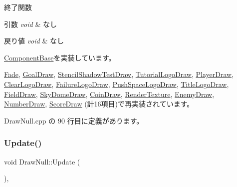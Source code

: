終了関数 


\begin{DoxyParams}{引数}
{\em void} & なし \\
\hline
\end{DoxyParams}

\begin{DoxyRetVals}{戻り値}
{\em void} & なし \\
\hline
\end{DoxyRetVals}


\mbox{\hyperlink{class_component_base_a9f42beaf0383d6f629819579cab4de57}{Component\+Base}}を実装しています。



\mbox{\hyperlink{class_fade_ae77d06811869d3c8162a42c3e0e14f7f}{Fade}}, \mbox{\hyperlink{class_goal_draw_a01318a0606848a3ca8ca7b7acbf4df24}{Goal\+Draw}}, \mbox{\hyperlink{class_stencil_shadow_test_draw_ad0672bf4ecfc8091cf54ed6f2c76b618}{Stencil\+Shadow\+Test\+Draw}}, \mbox{\hyperlink{class_tutorial_logo_draw_a949fb70954e3df28f87b8ed5c61bf8f1}{Tutorial\+Logo\+Draw}}, \mbox{\hyperlink{class_player_draw_a917b2947914287f23d87ca75cd68f553}{Player\+Draw}}, \mbox{\hyperlink{class_clear_logo_draw_aa73db5b701e644f8e552ddb254a0a9aa}{Clear\+Logo\+Draw}}, \mbox{\hyperlink{class_failure_logo_draw_a97646253380b54f37565650e211f33cd}{Failure\+Logo\+Draw}}, \mbox{\hyperlink{class_push_space_logo_draw_a79021c1df43968d6008de74126d53fba}{Push\+Space\+Logo\+Draw}}, \mbox{\hyperlink{class_title_logo_draw_a07bbf9e8de5c7b9ee028408496c13c50}{Title\+Logo\+Draw}}, \mbox{\hyperlink{class_field_draw_a89a78212c141714d9e39e25e663aaeff}{Field\+Draw}}, \mbox{\hyperlink{class_sky_dome_draw_aee1c6b102a97033073b2559b8c2c328b}{Sky\+Dome\+Draw}}, \mbox{\hyperlink{class_coin_draw_a6484c22a5598e298f18e7cd6083cd551}{Coin\+Draw}}, \mbox{\hyperlink{class_render_texture_a0e55cd9b412d87dfe1f4b90f29f357c8}{Render\+Texture}}, \mbox{\hyperlink{class_enemy_draw_a2861dc0623b0be7726bc69a6a469190e}{Enemy\+Draw}}, \mbox{\hyperlink{class_number_draw_a2b203d101f23f0d3f584937ff5ad662a}{Number\+Draw}}, \mbox{\hyperlink{class_score_draw_aad744f8a7a1202e6ba8117c660f297ee}{Score\+Draw}} (計16項目)で再実装されています。



 Draw\+Null.\+cpp の 90 行目に定義があります。

\mbox{\label{class_draw_null_ad32a508d269de7eda8ad24ea72230464}} 
\subsubsection{\texorpdfstring{Update()}{Update()}}
{\footnotesize\ttfamily void Draw\+Null\+::\+Update (\begin{DoxyParamCaption}{ }\end{DoxyParamCaption})\hspace{0.3cm}{\ttfamily [override]}, {\ttfamily [virtual]}}



